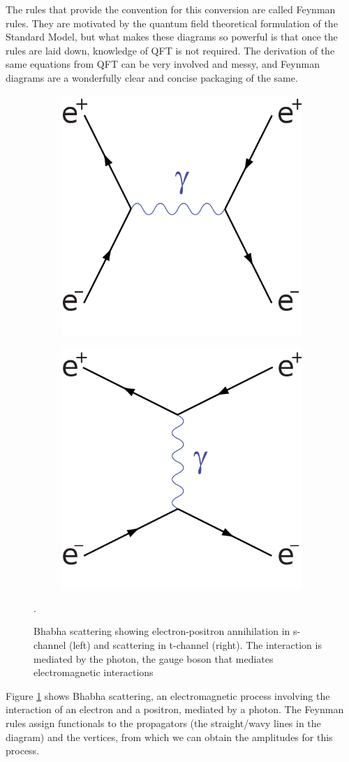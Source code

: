 \documentclass[11pt,a4paper]{report}
\begin{document}
The rules that provide the convention for this conversion are called Feynman rules. They are motivated by the quantum field theoretical formulation of the Standard Model, but what makes these diagrams so powerful is that once the rules are laid down, knowledge of QFT is not required. The derivation of the same equations from QFT can be very involved and messy, and Feynman diagrams are a wonderfully clear and concise packaging of the same.
\begin{figure}[H]
\centering
	\begin{subfigure}{0.4\textwidth}
	\centering
		\includegraphics[width=0.5\linewidth]{Bhabha_S_channel.png}
	\end{subfigure}
	\begin{subfigure}{0.4\textwidth}
	\centering
		\includegraphics[width=0.5\linewidth]{Bhabha_T_channel.png}
	\end{subfigure}
	\caption{Bhabha scattering showing electron-positron annihilation in s-channel (left) and scattering in t-channel (right). The interaction is mediated by the photon, the gauge boson that mediates electromagnetic interactions}.
	\label{fig:bhabha}
\end{figure}
Figure \ref{fig:bhabha} shows Bhabha scattering, an electromagnetic process involving the interaction of an electron and a positron, mediated by a photon. The Feynman rules assign functionals to the propagators (the straight/wavy lines in the diagram) and the vertices, from which we can obtain the amplitudes for this process.
\end{document}
